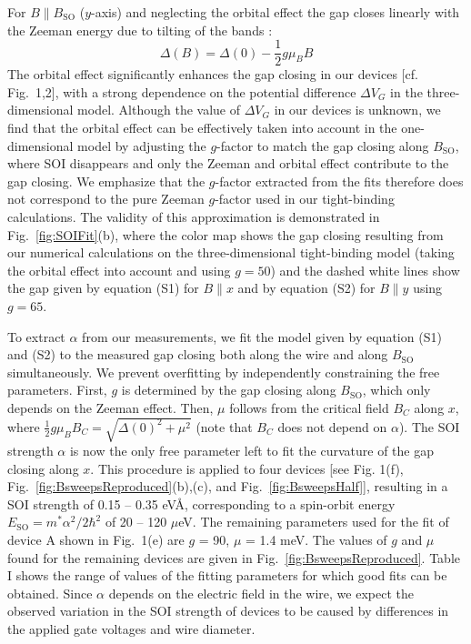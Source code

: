 For $B \parallel B_{\mathrm{SO}}$ ($y$-axis) and neglecting the orbital effect the gap closes linearly with the Zeeman energy due to tilting of the bands \cite{Osca2014,Rex2014}: 
\begin{equation}
\Delta(B) = \Delta(0) - \frac{1}{2}g\mu_BB
\end{equation}
The orbital effect significantly enhances the gap closing in our devices [cf.
Fig.~1,2], with a  strong dependence on the potential difference $\Delta V_G$ in the three-dimensional model.
Although the value of $\Delta V_G$ in our devices is unknown, we find that the orbital effect can be effectively taken into account in the one-dimensional model by adjusting the $g$-factor to match the gap closing along $B_{\mathrm{SO}}$, where SOI disappears and only the Zeeman and orbital effect contribute to the gap closing.
We emphasize that the $g$-factor extracted from the fits therefore does not correspond to the pure Zeeman $g$-factor used in our tight-binding calculations.
The validity of this approximation is demonstrated in Fig.~\ref{fig:SOIFit}(b), where the color map shows the gap closing resulting from our numerical calculations on the three-dimensional tight-binding model (taking the orbital effect into account and using $g = 50$) and the dashed white lines show the gap given by equation (S1) for $B\parallel x$ and by equation (S2) for $B\parallel y$ using $g=65$.

To extract $\alpha$ from our measurements, we fit the model given by equation (S1) and (S2) to the measured gap closing both along the wire and along $B_{\mathrm{SO}}$ simultaneously.
We prevent overfitting by independently constraining the free parameters.
First, $g$ is determined by the gap closing along $B_{\mathrm{SO}}$, which only depends on the Zeeman effect.
Then, $\mu$ follows from the critical field $B_C$ along $x$, where $\frac{1}{2}g\mu_BB_C = \sqrt{\Delta(0)^2+\mu^2}$ \cite{Lutchyn2010,Oreg2010} (note that $B_C$ does not depend on $\alpha$).
The SOI strength $\alpha$ is now the only free parameter left to fit the curvature of the gap closing along $x$.
This procedure is applied to four devices [see Fig. 1(f), Fig.~\ref{fig:BsweepsReproduced}(b),(c), and Fig.~\ref{fig:BsweepsHalf}], resulting in a SOI strength of 0.15 -- 0.35 eV\AA, corresponding to a spin-orbit energy $E_{\mathrm{SO}}=m^*\alpha^2/2\hbar^2$ of 20 -- 120 $\mu$eV.
The remaining parameters used for the fit of device A shown in Fig.~1(e) are $g$ = 90, $\mu$ = 1.4 meV.
The values of $g$ and $\mu$ found for the remaining devices are given in Fig.~\ref{fig:BsweepsReproduced}.
Table I shows the range of values of the fitting parameters for which good fits can be obtained.
Since $\alpha$ depends on the electric field in the wire, we expect the observed variation in the SOI strength of devices to be caused by differences in the applied gate voltages and wire diameter.

